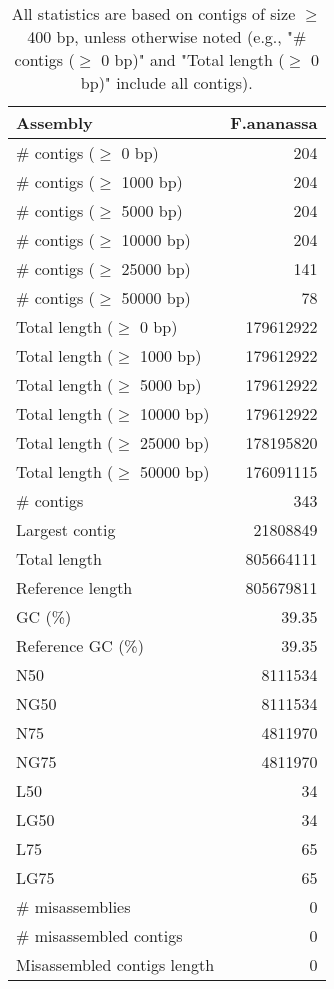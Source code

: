 \documentclass[12pt,a4paper]{article}
\begin{document}
\begin{table}[ht]
\begin{center}
\caption{All statistics are based on contigs of size $\geq$ 400 bp, unless otherwise noted (e.g., "\# contigs ($\geq$ 0 bp)" and "Total length ($\geq$ 0 bp)" include all contigs).}
\begin{tabular}{|l*{1}{|r}|}
\hline
Assembly & F.ananassa \\ \hline
\# contigs ($\geq$ 0 bp) & 204 \\ \hline
\# contigs ($\geq$ 1000 bp) & 204 \\ \hline
\# contigs ($\geq$ 5000 bp) & 204 \\ \hline
\# contigs ($\geq$ 10000 bp) & 204 \\ \hline
\# contigs ($\geq$ 25000 bp) & 141 \\ \hline
\# contigs ($\geq$ 50000 bp) & 78 \\ \hline
Total length ($\geq$ 0 bp) & 179612922 \\ \hline
Total length ($\geq$ 1000 bp) & 179612922 \\ \hline
Total length ($\geq$ 5000 bp) & 179612922 \\ \hline
Total length ($\geq$ 10000 bp) & 179612922 \\ \hline
Total length ($\geq$ 25000 bp) & 178195820 \\ \hline
Total length ($\geq$ 50000 bp) & 176091115 \\ \hline
\# contigs & 343 \\ \hline
Largest contig & 21808849 \\ \hline
Total length & 805664111 \\ \hline
Reference length & 805679811 \\ \hline
GC (\%) & 39.35 \\ \hline
Reference GC (\%) & 39.35 \\ \hline
N50 & 8111534 \\ \hline
NG50 & 8111534 \\ \hline
N75 & 4811970 \\ \hline
NG75 & 4811970 \\ \hline
L50 & 34 \\ \hline
LG50 & 34 \\ \hline
L75 & 65 \\ \hline
LG75 & 65 \\ \hline
\# misassemblies & 0 \\ \hline
\# misassembled contigs & 0 \\ \hline
Misassembled contigs length & 0 \\ \hline

\end{tabular}
\end{center}
\end{table}
\end{document}

